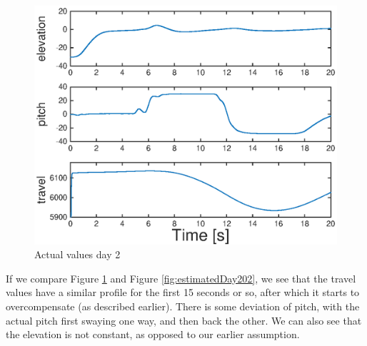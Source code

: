 \begin{figure}[H]
	\centering
	\includegraphics[width=\textwidth]{day2}
	\caption{Actual values day 2}
	\label{fig:day2}
\end{figure}

If we compare Figure \ref{fig:day2} and Figure \ref{fig:estimatedDay202}, we see that the travel values have a similar profile for the first 15 seconds or so, after which it starts to overcompensate (as described earlier). There is some deviation of pitch, with the actual pitch first swaying one way, and then back the other. We can also see that the elevation is not constant, as opposed to our earlier assumption.